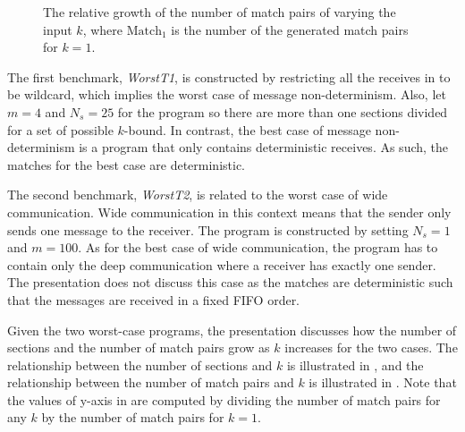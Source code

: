 \begin{figure}[!h]
\begin{minipage}{.55\textwidth}
\end{minipage}

\caption{The relative growth of the number of match pairs of varying the input $k$, where $\mathrm{Match}_1$ is the number of the generated match pairs for $k=1$.}
\label{fig:relation:match}
\end{figure}

The first benchmark, \textit{WorstT1}, is constructed by restricting all the receives in  to be wildcard, which implies the worst case of message non-determinism. Also, let $m=4$ and $N_s = 25$ for the program so there are more than one sections divided for a set of possible $k$-bound. In contrast, the best case of message non-determinism is a program that only contains deterministic receives. As such, the matches for the best case are deterministic.

The second benchmark, \textit{WorstT2}, is related to the worst case of wide communication. Wide communication in this context means that the sender only sends one message to the receiver. The program is constructed by setting $N_s=1$ and $m=100$. As for the best case of wide communication, the program has to contain only the deep communication where a receiver has exactly one sender. The presentation does not discuss this case as the matches are deterministic such that the messages are received in a fixed FIFO order. 

Given the two worst-case programs, the presentation discusses how the number of sections and the number of match pairs grow as $k$ increases for the two cases. 
The relationship between the number of sections and $k$ is illustrated in , and the relationship between the number of match pairs and $k$ is illustrated in .
Note that the values of y-axis in  are computed by dividing the number of match pairs for any $k$ by the number of match pairs for $k=1$.

